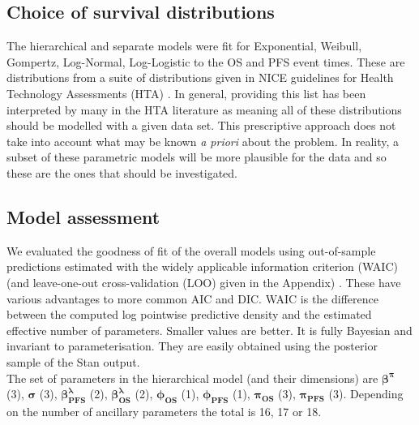 \documentclass[AMA,STIX1COL]{WileyNJD-v2}
\begin{document}
%
\subsection{Choice of survival distributions}
The hierarchical and separate models were fit for Exponential, Weibull, Gompertz, Log-Normal, Log-Logistic to the OS and PFS event times.
These are distributions from a suite of distributions given in NICE guidelines for Health Technology Assessments (HTA) \cite{Latimer2011}.
In general, providing this list has been interpreted by many in the HTA literature as meaning all of these distributions should be modelled with a given data set.
This prescriptive approach does not take into account what may be known {\it a priori} about the problem.
In reality, a subset of these parametric models will be more plausible for the data and so these are the ones that should be investigated.

%
\subsection{Model assessment}
We evaluated the goodness of fit of the overall models using out-of-sample predictions estimated with the widely applicable information criterion (WAIC) (and leave-one-out cross-validation (LOO) given in the Appendix) \cite{Vehtari2017}. These have various advantages to more common AIC and DIC. WAIC is the difference between the computed log pointwise predictive density and the estimated effective number of parameters. Smaller values are better. It is fully Bayesian and invariant to parameterisation. They are easily obtained using the posterior sample of the Stan output.\\
The set of parameters in the hierarchical model (and their dimensions) are
$\mathbf{\beta^{\pi}}$ (3), $\mathbf{\sigma}$ (3), $\mathbf{\beta^{\lambda}_{PFS}}$ (2), $\mathbf{\beta^{\lambda}_{OS}}$ (2), $\mathbf{\phi_{OS}}$ (1), $\mathbf{\phi_{PFS}}$ (1), $\mathbf{\pi_{OS}}$ (3), $\mathbf{\pi_{PFS}}$ (3).
Depending on the number of ancillary parameters the total is 16, 17 or 18.

\end{document}
